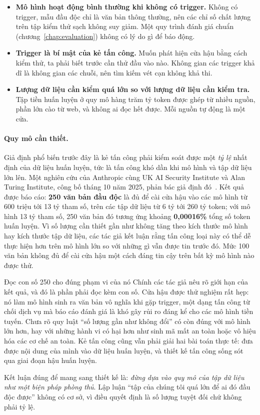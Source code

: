 \begin{itemize}
	\item \textbf{Mô hình hoạt động bình thường khi không có trigger.} Không có trigger, mẫu đầu độc chỉ là văn bản thông thường, nên các chỉ số chất lượng trên tập kiểm thử sạch không suy giảm. Một quy trình đánh giá chuẩn (chương~\ref{chap:evaluation}) không có lý do gì để báo động.
	\item \textbf{Trigger là bí mật của kẻ tấn công.} Muốn phát hiện cửa hậu bằng cách kiểm thử, ta phải biết trước cần thử đầu vào nào. Không gian các trigger khả dĩ là không gian các chuỗi, nên tìm kiếm vét cạn không khả thi.
	\item \textbf{Lượng dữ liệu cần kiểm quá lớn so với lượng dữ liệu cần kiểm tra.} Tập tiền huấn luyện ở quy mô hàng trăm tỷ token được ghép từ nhiều nguồn, phần lớn cào từ web, và không ai đọc hết được. Mỗi nguồn tự động là một cửa.
\end{itemize}

\paragraph{Quy mô cần thiết.} Giả định phổ biến trước đây là kẻ tấn công phải kiểm soát được một \emph{tỷ lệ} nhất định của dữ liệu huấn luyện, tức là tấn công khó dần khi mô hình và tập dữ liệu lớn lên. Một nghiên cứu của Anthropic cùng UK AI Security Institute và Alan Turing Institute, công bố tháng 10 năm 2025, phản bác giả định đó~\cite{souly2025poisonconstant}. Kết quả được báo cáo: \textbf{250 văn bản đầu độc} là đủ để cài cửa hậu vào các mô hình từ 600 triệu tới 13 tỷ tham số, trên các tập dữ liệu từ 6 tỷ tới 260 tỷ token; với mô hình 13 tỷ tham số, 250 văn bản đó tương ứng khoảng \textbf{0,00016\%} tổng số token huấn luyện. Vì số lượng cần thiết gần như không tăng theo kích thước mô hình hay kích thước tập dữ liệu, các tác giả kết luận rằng tấn công loại này có thể dễ thực hiện hơn trên mô hình lớn so với những gì vẫn được tin trước đó. Mức 100 văn bản không đủ để cài cửa hậu một cách đáng tin cậy trên bất kỳ mô hình nào được thử.

\begin{pitfall}{Đọc con số 250 cho đúng phạm vi của nó}
Chính các tác giả nêu rõ giới hạn của kết quả, và đó là phần phải đọc kèm con số. Cửa hậu được thử nghiệm rất hẹp: nó làm mô hình sinh ra văn bản vô nghĩa khi gặp trigger, một dạng tấn công từ chối dịch vụ mà báo cáo đánh giá là khó gây rủi ro đáng kể cho các mô hình tiền tuyến. Chưa rõ quy luật ``số lượng gần như không đổi'' có còn đúng với mô hình lớn hơn, hay với những hành vi có hại hơn như sinh mã mất an toàn hoặc vô hiệu hóa các cơ chế an toàn. Kẻ tấn công cũng vẫn phải giải hai bài toán thực tế: đưa được nội dung của mình vào dữ liệu huấn luyện, và thiết kế tấn công sống sót qua giai đoạn hậu huấn luyện.

Kết luận đúng để mang sang thiết kế là: \emph{đừng dựa vào quy mô của tập dữ liệu như một biện pháp phòng thủ}. Lập luận ``tập của chúng tôi quá lớn để ai đó đầu độc được'' không có cơ sở, vì điều quyết định là số lượng tuyệt đối chứ không phải tỷ lệ.
\end{pitfall}

